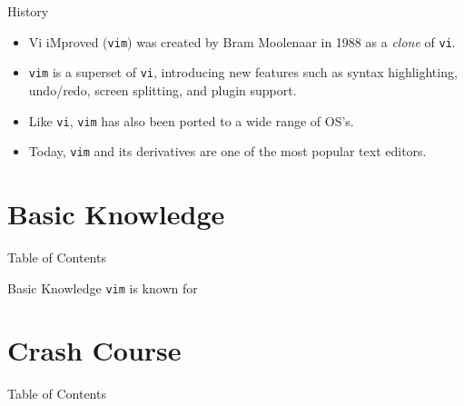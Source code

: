 \documentclass{beamer}
\begin{document}
\begin{frame}{History}
	\begin{itemize}
		\item Vi iMproved (\texttt{vim}) was created by Bram Moolenaar
			in 1988 as a \textit{clone} of \texttt{vi}.
			\pause

		\item \texttt{vim} is a superset of \texttt{vi}, introducing new
			features such as syntax highlighting, undo/redo, screen
			splitting, and plugin support.
			\pause

		\item Like \texttt{vi}, \texttt{vim} has also been ported to a
			wide range of OS's.
			\pause

		\item Today, \texttt{vim} and its derivatives
			are one of the most popular text
			editors.\footnotemark
			\pause
	\end{itemize}

\end{frame}


\section{Basic Knowledge}
\begin{frame}{Table of Contents}
	\tableofcontents[currentsection]
\end{frame}

\begin{frame}{Basic Knowledge}
	\texttt{vim} is known for 
\end{frame}

\section{Crash Course}
\begin{frame}{Table of Contents}
	\tableofcontents[currentsection]
\end{frame}
\end{document}
